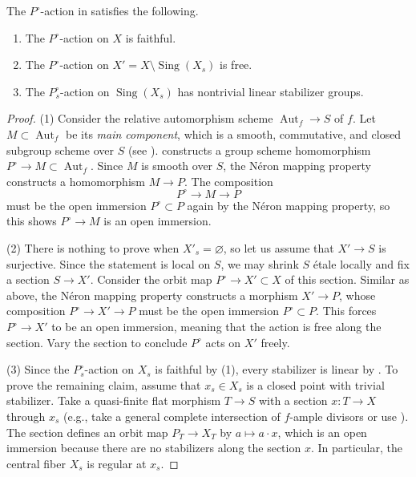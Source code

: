 \documentclass[reqno, letterpaper]{amsart}
\numberwithin{equation}{subsection}
\let\emptyset\varnothing
\let\to\longrightarrow
\let\mapsto\longmapsto
\DeclareMathOperator{\Aut}{Aut}
\DeclareMathOperator{\Sing}{Sing}
\begin{document}
		\begin{proposition} \label{prop:P-action property}
			The $P^\circ$-action in  satisfies the following.
			\begin{enumerate}
				\item The $P^\circ$-action on $X$ is faithful.
				\item The $P^\circ$-action on $X' = X \setminus \Sing(X_s)$ is free.
				\item The $P^\circ_s$-action on $\Sing(X_s)$ has nontrivial linear stabilizer groups.
			\end{enumerate}
		\end{proposition}
		\begin{proof}
			(1) Consider the relative automorphism scheme $\Aut_f \to S$ of $f$. Let $M \subset \Aut_f$ be its \emph{main component}, which is a smooth, commutative, and closed subgroup scheme over $S$ (see \cite[Definition~2.36, Proposition~2.42]{kim24}).  constructs a group scheme homomorphism $P^\circ \to M \subset \Aut_f$. Since $M$ is smooth over $S$, the N\'eron mapping property constructs a homomorphism $M \to P$. The composition
			\[ P^\circ \to M \to P \]
			must be the open immersion $P^\circ \subset P$ again by the N\'eron mapping property, so this shows $P^\circ \to M$ is an open immersion.
			
			\medskip
			
			(2) There is nothing to prove when $X'_s = \emptyset$, so let us assume that $X' \to S$ is surjective. Since the statement is local on $S$, we may shrink $S$ \'etale locally and fix a section $S \to X'$. Consider the orbit map $P^\circ \to X' \subset X$ of this section. Similar as above, the N\'eron mapping property constructs a morphism $X' \to P$, whose composition $P^\circ \to X' \to P$ must be the open immersion $P^\circ \subset P$. This forces $P^\circ \to X'$ to be an open immersion, meaning that the action is free along the section. Vary the section to conclude $P^\circ$ acts on $X'$ freely.
			
			\medskip
			
			(3) Since the $P^\circ_s$-action on $X_s$ is faithful by (1), every stabilizer is linear by . To prove the remaining claim, assume that $x_s \in X_s$ is a closed point with trivial stabilizer. Take a quasi-finite flat morphism $T \to S$ with a section $x : T \to X$ through $x_s$ (e.g., take a general complete intersection of $f$-ample divisors or use \cite[$\mathrm {VI_B}$~Lemma~5.6.1]{SGA3I}). The section defines an orbit map $P_T \to X_T$ by $a \mapsto a \cdot x$, which is an open immersion because there are no stabilizers along the section $x$. In particular, the central fiber $X_s$ is regular at $x_s$.
		\end{proof}
		
\end{document}
